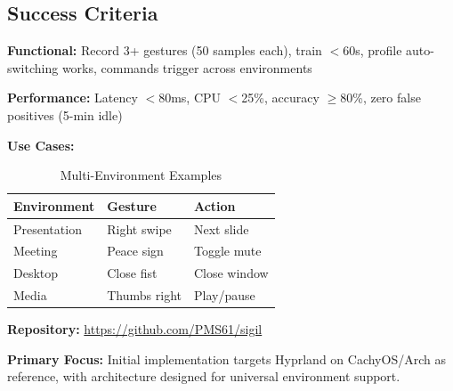 \documentclass[11pt]{article}
\begin{document}
\subsection{Success Criteria}

\textbf{Functional:} Record 3+ gestures (50 samples each), train $<$60s, profile auto-switching works, commands trigger across environments

\textbf{Performance:} Latency $<$80ms, CPU $<$25\%, accuracy $\geq$80\%, zero false positives (5-min idle)

\textbf{Use Cases:}

\begin{table}[h]
\centering
\small
\begin{tabular}{@{}lll@{}}
\toprule
\textbf{Environment} & \textbf{Gesture} & \textbf{Action} \\
\midrule
Presentation & Right swipe & Next slide \\
Meeting & Peace sign & Toggle mute \\
Desktop & Close fist & Close window \\
Media & Thumbs right & Play/pause \\
\bottomrule
\end{tabular}
\caption{Multi-Environment Examples}
\end{table}

\vspace{1em}
\noindent\textbf{Repository:} \url{https://github.com/PMS61/sigil}

\noindent\textbf{Primary Focus:} Initial implementation targets Hyprland on CachyOS/Arch as reference, with architecture designed for universal environment support.
\end{document}
